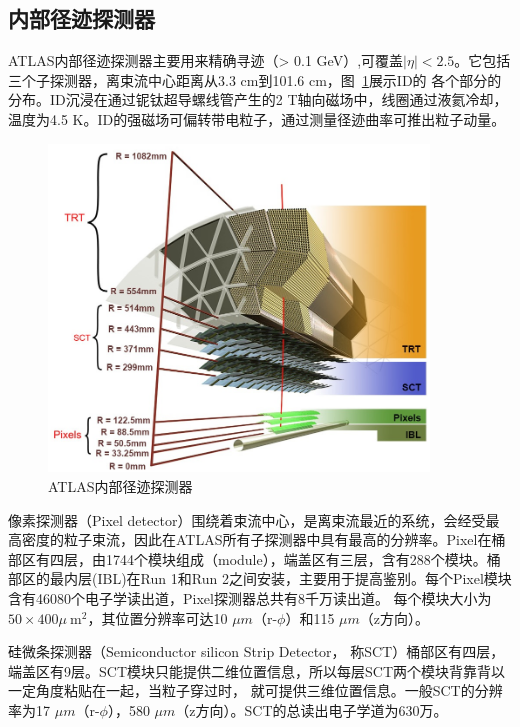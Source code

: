 \subsection{内部径迹探测器}
ATLAS内部径迹探测器主要用来精确寻迹（\pt > 0.1 GeV）,可覆盖$|\eta|<2.5$。它包括三个子探测器，离束流中心距离从3.3 cm到101.6 cm，图~\ref{fig:ATLAS_ID_sideview}展示ID的
各个部分的分布。ID沉浸在通过铌钛超导螺线管产生的2 T轴向磁场中，线圈通过液氦冷却，温度为4.5 K。ID的强磁场可偏转带电粒子，通过测量径迹曲率可推出粒子动量。
\begin{figure}[h]
\begin{center}
\includegraphics[width=0.9\textwidth]{fig/ATLAS_ID_sideview.png}
\caption{ATLAS内部径迹探测器} \label{fig:ATLAS_ID_sideview}
\end{center}
\end{figure}

像素探测器（Pixel detector）围绕着束流中心，是离束流最近的系统，会经受最高密度的粒子束流，因此在ATLAS所有子探测器中具有最高的分辨率。Pixel在桶部区有四层，由1744个模块组成（module），端盖区有三层，含有288个模块。桶部区的最内层(IBL)在Run 1和Run 2之间安装，主要用于提高\bjet 鉴别。每个Pixel模块含有46080个电子学读出道，Pixel探测器总共有8千万读出道。
每个模块大小为$50\times400 \mu ~\text{m}^{2}$，其位置分辨率可达10 $\mu m$（r-$\phi$）和115 $\mu m$（z方向）。

硅微条探测器（Semiconductor silicon Strip Detector， 称SCT）桶部区有四层，端盖区有9层。SCT模块只能提供二维位置信息，所以每层SCT两个模块背靠背以一定角度粘贴在一起，当粒子穿过时，
就可提供三维位置信息。一般SCT的分辨率为17 $\mu m$（r-$\phi$），580 $\mu m$（z方向）。SCT的总读出电子学道为630万。

